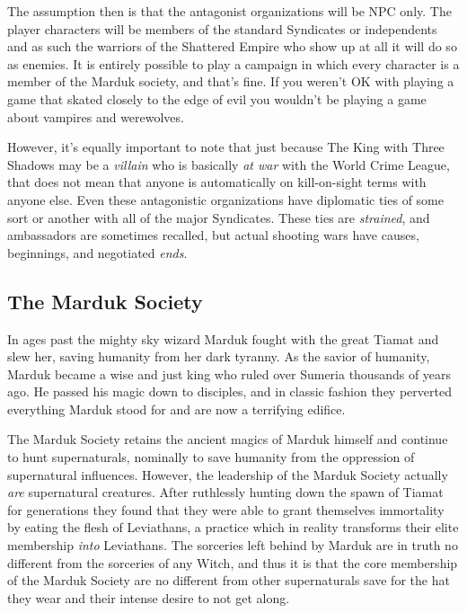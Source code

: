 The assumption then is that the antagonist organizations will be NPC only. The player characters will be members of the standard Syndicates or independents and as such the warriors of the Shattered Empire who show up at all it will do so as enemies. It is entirely possible to play a campaign in which every character is a member of the Marduk society, and that's fine. If you weren't OK with playing a game that skated closely to the edge of evil you wouldn't be playing a game about vampires and werewolves.

However, it's equally important to note that just because The King with Three Shadows may be a \textit{villain} who is basically \textit{at war} with the World Crime League, that does not mean that anyone is automatically on kill-on-sight terms with anyone else. Even these antagonistic organizations have diplomatic ties of some sort or another with all of the major Syndicates. These ties are \textit{strained}, and ambassadors are sometimes recalled, but actual shooting wars have causes, beginnings, and negotiated \textit{ends}.

\subsection{The Marduk Society} 

In ages past the mighty sky wizard Marduk fought with the great Tiamat and slew her, saving humanity from her dark tyranny. As the savior of humanity, Marduk became a wise and just king who ruled over Sumeria thousands of years ago. He passed his magic down to disciples, and in classic fashion they perverted everything Marduk stood for and are now a terrifying edifice.

The Marduk Society retains the ancient magics of Marduk himself and continue to hunt supernaturals, nominally to save humanity from the oppression of supernatural influences. However, the leadership of the Marduk Society actually \textit{are} supernatural creatures. After ruthlessly hunting down the spawn of Tiamat for generations they found that they were able to grant themselves immortality by eating the flesh of Leviathans, a practice which in reality transforms their elite membership \textit{into} Leviathans. The sorceries left behind by Marduk are in truth no different from the sorceries of any Witch, and thus it is that the core membership of the Marduk Society are no different from other supernaturals save for the hat they wear and their intense desire to not get along.

